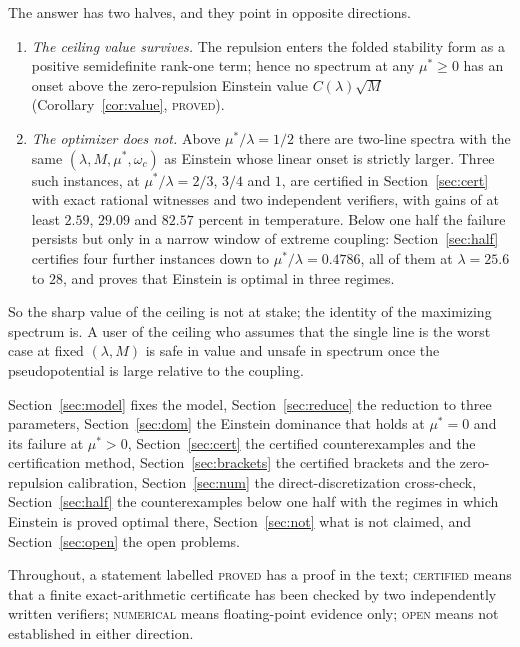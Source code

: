 \documentclass[11pt]{article}
\newcommand{\muS}{\mu^{*}}
\theoremstyle{definition}
\theoremstyle{remark}
\begin{document}
The answer has two halves, and they point in opposite directions.
\begin{enumerate}[label=(\arabic*),leftmargin=2.2em]
\item \emph{The ceiling value survives.} The repulsion enters the folded stability form
as a positive semidefinite rank-one term; hence no spectrum at any $\muS\ge0$ has an
onset above the zero-repulsion Einstein value $C(\lambda)\sqrt M$
(Corollary~\ref{cor:value}, \textsc{proved}).
\item \emph{The optimizer does not.} Above $\muS/\lambda=1/2$ there are two-line spectra
with the same $(\lambda,M,\muS,\omega_c)$ as Einstein whose linear onset is strictly
larger. Three such instances, at $\muS/\lambda=2/3$, $3/4$ and $1$, are certified in
Section~\ref{sec:cert} with exact rational witnesses and two independent verifiers, with
gains of at least $2.59$, $29.09$ and $82.57$ percent in temperature. Below one half the
failure persists but only in a narrow window of extreme coupling: Section~\ref{sec:half}
certifies four further instances down to $\muS/\lambda=0.4786$, all of them at
$\lambda=25.6$ to $28$, and proves that Einstein is optimal in three regimes.
\end{enumerate}
So the sharp value of the ceiling is not at stake; the identity of the maximizing spectrum
is. A user of the ceiling who assumes that the single line is the worst case at fixed
$(\lambda,M)$ is safe in value and unsafe in spectrum once the pseudopotential is large
relative to the coupling.

Section~\ref{sec:model} fixes the model, Section~\ref{sec:reduce} the reduction to three
parameters, Section~\ref{sec:dom} the Einstein dominance that holds at $\muS=0$ and its
failure at $\muS>0$, Section~\ref{sec:cert} the certified counterexamples and the
certification method, Section~\ref{sec:brackets} the certified brackets and the
zero-repulsion calibration, Section~\ref{sec:num} the direct-discretization cross-check,
Section~\ref{sec:half} the counterexamples below one half with the regimes in which
Einstein is proved optimal there, Section~\ref{sec:not} what is not claimed, and
Section~\ref{sec:open} the open problems.

Throughout, a statement labelled \textsc{proved} has a proof in the text;
\textsc{certified} means that a finite exact-arithmetic certificate has been checked by
two independently written verifiers; \textsc{numerical} means floating-point evidence
only; \textsc{open} means not established in either direction.
\end{document}
